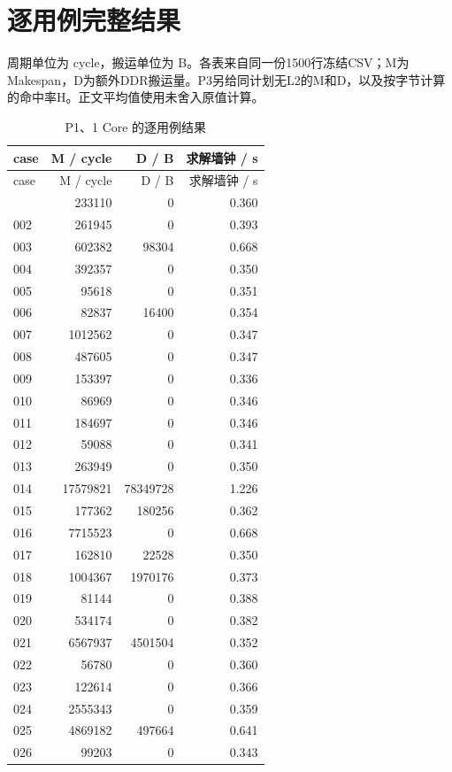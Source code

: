 \documentclass[anonymous,notoc]{gmcm2026}
\begin{document}
\pagestyle{plain}
\section{逐用例完整结果}
周期单位为 cycle，搬运单位为 B。各表来自同一份1500行冻结CSV；M为Makespan，D为额外DDR搬运量。P3另给同计划无L2的M和D，以及按字节计算的命中率H。正文平均值使用未舍入原值计算。

\begin{longtable}{lrrr}
\caption{P1、1 Core 的逐用例结果}\\
\toprule
case & M / cycle & D / B & 求解墙钟 / s\\\midrule
\endfirsthead
\toprule
case & M / cycle & D / B & 求解墙钟 / s\\\midrule
\endhead
\bottomrule\endfoot
001 & 233110 & 0 & 0.360 \\
002 & 261945 & 0 & 0.393 \\
003 & 602382 & 98304 & 0.668 \\
004 & 392357 & 0 & 0.350 \\
005 & 95618 & 0 & 0.351 \\
006 & 82837 & 16400 & 0.354 \\
007 & 1012562 & 0 & 0.347 \\
008 & 487605 & 0 & 0.347 \\
009 & 153397 & 0 & 0.336 \\
010 & 86969 & 0 & 0.346 \\
011 & 184697 & 0 & 0.346 \\
012 & 59088 & 0 & 0.341 \\
013 & 263949 & 0 & 0.350 \\
014 & 17579821 & 78349728 & 1.226 \\
015 & 177362 & 180256 & 0.362 \\
016 & 7715523 & 0 & 0.668 \\
017 & 162810 & 22528 & 0.350 \\
018 & 1004367 & 1970176 & 0.373 \\
019 & 81144 & 0 & 0.388 \\
020 & 534174 & 0 & 0.382 \\
021 & 6567937 & 4501504 & 0.352 \\
022 & 56780 & 0 & 0.360 \\
023 & 122614 & 0 & 0.366 \\
024 & 2555343 & 0 & 0.359 \\
025 & 4869182 & 497664 & 0.641 \\
026 & 99203 & 0 & 0.343 \\

\end{longtable}
\end{document}
